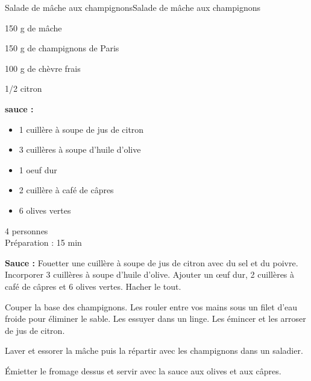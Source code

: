 \begin{recette}{Salade de mâche aux champignons}{Salade de mâche aux champignons}

\begin{ingredients}
150 g de mâche\par
150 g de champignons de Paris\par
100 g de chèvre frais\par
1/2 citron\par
\textbf{ sauce :}\par
\begin{itemize}\par
\item[] 1 cuillère à soupe de jus de citron\par
\item[] 3 cuillères à soupe d'huile d'olive\par
\item[] 1 oeuf dur\par
\item[] 2 cuillère à café de câpres\par
\item[] 6 olives vertes\par
\end{itemize}\par
\end{ingredients}

\begin{infos}
4 personnes\\
Préparation : 15 min	\\
\end{infos}

\begin{etapes}
\item \textbf{Sauce :} Fouetter une cuillère à soupe de jus de citron avec du sel et du poivre. Incorporer 3 cuillères à soupe d'huile d'olive. Ajouter un œuf dur, 2 cuillères à café de câpres et 6 olives vertes. Hacher le tout.
\item Couper la base des champignons. Les rouler entre vos mains sous un filet d'eau froide pour éliminer le sable. Les essuyer dans un linge. Les émincer et les arroser de jus de citron.
\item Laver et essorer la mâche puis la répartir avec les champignons dans un saladier.
\item Émietter le fromage dessus et servir avec la sauce aux olives et aux câpres.
\end{etapes}

\end{recette}